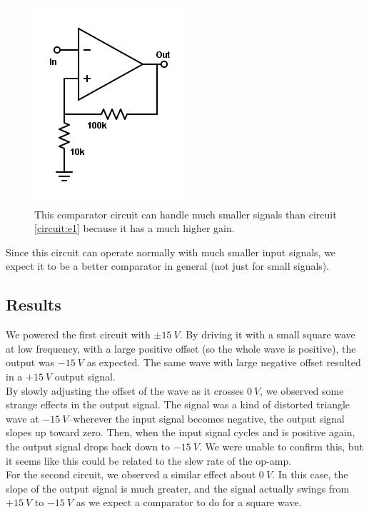\documentclass[11pt]{article}
\begin{document}
\begin{figure}[H]
    \centering
    \includegraphics[scale=0.5]{Diagrams/c-e2.png}
    \caption{This comparator circuit can handle much smaller signals than circuit \ref{circuit:e1} because it has a much higher gain.}
\end{figure}

Since this circuit can operate normally with much smaller input signals, we expect it to be a better comparator in general (not just for small signals).\\


\subsection{Results}

We powered the first circuit with $\pm 15\ V$. By driving it with a small square wave at low frequency, with a large positive offset (so the whole wave is positive), the output was $-15\ V$ as expected. The same wave with large negative offset resulted in a $+15\ V$ output signal.\\

By slowly adjusting the offset of the wave as it crosses $0\ V$, we observed some strange effects in the output signal. The signal was a kind of distorted triangle wave at $-15\ V$--wherever the input signal becomes negative, the output signal slopes up toward zero. Then, when the input signal cycles and is positive again, the output signal drops back down to $-15\ V$. We were unable to confirm this, but it seems like this could be related to the slew rate of the op-amp.\\

For the second circuit, we observed a similar effect about $0\ V$. In this case, the slope of the output signal is much greater, and the signal actually swings from $+15\ V$ to $-15\ V$ as we expect a comparator to do for a square wave.
\end{document}
